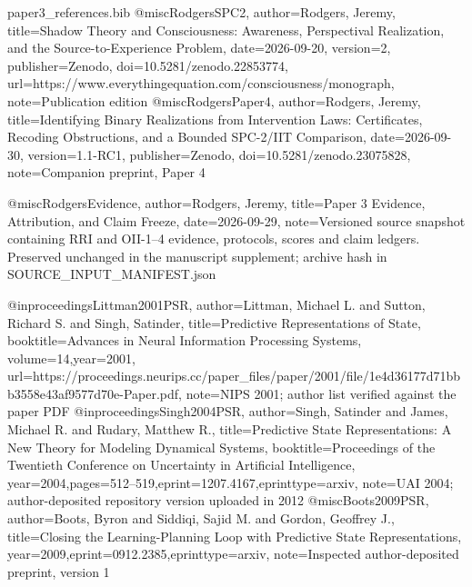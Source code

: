 \begin{filecontents*}[overwrite]{paper3_references.bib}
@misc{RodgersSPC2,
 author={Rodgers, Jeremy},
 title={Shadow Theory and Consciousness: Awareness, Perspectival Realization, and the Source-to-Experience Problem},
 date={2026-09-20}, version={2}, publisher={Zenodo},
 doi={10.5281/zenodo.22853774},
 url={https://www.everythingequation.com/consciousness/monograph},
 note={Publication edition}
}
@misc{RodgersPaper4,
 author={Rodgers, Jeremy},
 title={Identifying Binary Realizations from Intervention Laws: Certificates, Recoding Obstructions, and a Bounded {SPC-2}/{IIT} Comparison},
 date={2026-09-30}, version={1.1-RC1}, publisher={Zenodo},
 doi={10.5281/zenodo.23075828},
 note={Companion preprint, Paper 4}
}

@misc{RodgersEvidence,
 author={Rodgers, Jeremy}, title={Paper 3 Evidence, Attribution, and Claim Freeze},
 date={2026-09-29}, note={Versioned source snapshot containing RRI and OII-1--4 evidence, protocols, scores and claim ledgers. Preserved unchanged in the manuscript supplement; archive hash in SOURCE\_INPUT\_MANIFEST.json}
}

@inproceedings{Littman2001PSR,
 author={Littman, Michael L. and Sutton, Richard S. and Singh, Satinder},
 title={Predictive Representations of State},
 booktitle={Advances in Neural Information Processing Systems}, volume={14},year={2001},
 url={https://proceedings.neurips.cc/paper_files/paper/2001/file/1e4d36177d71bbb3558e43af9577d70e-Paper.pdf},
 note={NIPS 2001; author list verified against the paper PDF}}
@inproceedings{Singh2004PSR,
 author={Singh, Satinder and James, Michael R. and Rudary, Matthew R.},
 title={Predictive State Representations: A New Theory for Modeling Dynamical Systems},
 booktitle={Proceedings of the Twentieth Conference on Uncertainty in Artificial Intelligence},
 year={2004},pages={512--519},eprint={1207.4167},eprinttype={arxiv},
 note={UAI 2004; author-deposited repository version uploaded in 2012}}
@misc{Boots2009PSR,
 author={Boots, Byron and Siddiqi, Sajid M. and Gordon, Geoffrey J.},
 title={Closing the Learning-Planning Loop with Predictive State Representations},
 year={2009},eprint={0912.2385},eprinttype={arxiv},
 note={Inspected author-deposited preprint, version 1}}
\end{filecontents*}

